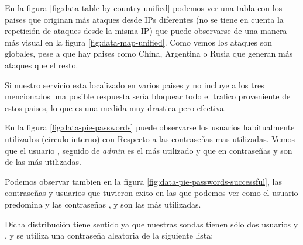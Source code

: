 En la figura \ref{fig:data-table-by-country-unified} podemos ver una tabla con los paises que originan más ataques desde IPs diferentes (no se tiene en cuenta 
la repetición de ataques desde la misma IP) que puede observarse de una manera más visual en la figura \ref{fig:data-map-unified}. Como vemos los ataques son globales,
pese a que hay paises como China, Argentina o Rusia que generan más ataques que el resto.

Si nuestro servicio esta localizado en varios paises y no incluye a los tres mencionados una posible respuesta sería bloquear todo el trafico proveniente
de estos paises, lo que es una medida muy drastica pero efectiva. 

En la figura \ref{fig:data-pie-passwords} puede observarse los usuarios habitualmente utilizados (circulo interno) con Respecto
a las contraseñas mas utilizadas. Vemos que el usuario , seguido de \emph{admin} es el más utilizado y que en contraseñas
 y  son de las más utilizadas.

Podemos observar tambien en la figura \ref{fig:data-pie-passwords-successful}, las contraseñas y usuarios que tuvieron exito en las que podemos ver
como el usuario  predomina y las contraseñas ,  y  son las más utilizadas.

Dicha distribución tiene sentido ya que nuestras sondas tienen sólo dos usuarios  y , y se utiliza una contraseña aleatoria 
de la siguiente lista:

